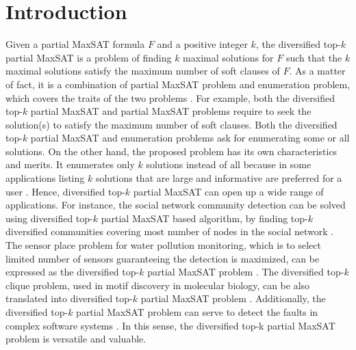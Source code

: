 \documentclass{llncs}
\begin{document}
\section{Introduction}
Given a partial MaxSAT formula $F$ and a positive integer $k$, the diversified top-$k$ partial MaxSAT is a problem of finding $k$ maximal solutions for $F$ such that the $k$ maximal solutions satisfy the maximum number of soft clauses of $F$. As a matter of fact, it is a combination of partial MaxSAT problem and enumeration problem, which covers the traits of the two problems \cite{Chu 2017,Chu-Min2016,Michele2013,ChuMin2016}. For example, both the diversified top-$k$ partial MaxSAT and partial MaxSAT problems require to seek the solution(s) to satisfy the maximum number of soft clauses. Both the diversified top-$k$ partial MaxSAT and enumeration problems ask for enumerating some or all solutions. On the other hand, the proposed problem has its own characteristics and merits. It enumerates only $k$ solutions instead of all because in some applications listing $k$ solutions that are large and informative are preferred for a user \cite{Bernard1979}. Hence, diversified top-$k$ partial MaxSAT can open up a wide range of applications. For instance, the social network community detection can be solved using diversified top-$k$ partial MaxSAT based algorithm, by finding top-$k$ diversified communities covering most number of nodes in the social network \cite{Kempe2003}. The sensor place problem for water pollution monitoring, which is to select limited number of sensors guaranteeing the detection is maximized, can be expressed as the diversified top-$k$ partial MaxSAT problem \cite{Krause2007}. The diversified top-$k$ clique problem, used in motif discovery in molecular biology, can be also translated into diversified top-$k$ partial MaxSAT problem \cite{Zheng2011}. Additionally, the diversified top-$k$ partial MaxSAT problem can serve to detect the faults in complex software systems \cite{Yilmaz2006}. In this sense, the diversified top-k partial MaxSAT problem is versatile and valuable.
\end{document}
